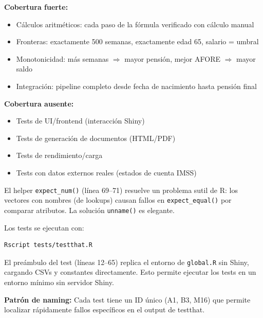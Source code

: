 \documentclass[11pt,a4paper]{report}
\begin{document}
\begin{tcolorbox}[colback=green!5!white, colframe=green!50!black, title=\textbf{Intuici\'on: Qu\'e Cubren y Qu\'e No}]
\textbf{Cobertura fuerte:}
\begin{itemize}
  \item C\'alculos aritm\'eticos: cada paso de la f\'ormula verificado con c\'alculo manual
  \item Fronteras: exactamente 500 semanas, exactamente edad 65, salario = umbral
  \item Monotonicidad: m\'as semanas $\Rightarrow$ mayor pensi\'on, mejor AFORE $\Rightarrow$ mayor saldo
  \item Integraci\'on: pipeline completo desde fecha de nacimiento hasta pensi\'on final
\end{itemize}

\textbf{Cobertura ausente:}
\begin{itemize}
  \item Tests de UI/frontend (interacci\'on Shiny)
  \item Tests de generaci\'on de documentos (HTML/PDF)
  \item Tests de rendimiento/carga
  \item Tests con datos externos reales (estados de cuenta IMSS)
\end{itemize}

El helper \texttt{expect\_num()} (l\'inea 69--71) resuelve un problema sutil de R: los vectores con nombres (de lookups) causan fallos en \texttt{expect\_equal()} por comparar atributos. La soluci\'on \texttt{unname()} es elegante.
\end{tcolorbox}

\begin{tcolorbox}[colback=orange!5!white, colframe=orange!75!black, title=\textbf{Aplicaci\'on en C\'odigo: Ejecuci\'on}]
Los tests se ejecutan con:
\begin{lstlisting}[language=bash]
Rscript tests/testthat.R
\end{lstlisting}

El pre\'ambulo del test (l\'ineas 12--65) replica el entorno de \texttt{global.R} sin Shiny, cargando CSVs y constantes directamente. Esto permite ejecutar los tests en un entorno m\'inimo sin servidor Shiny.

\textbf{Patr\'on de naming:} Cada test tiene un ID \'unico (A1, B3, M16) que permite localizar r\'apidamente fallos espec\'ificos en el output de testthat.
\end{tcolorbox}
\end{document}
